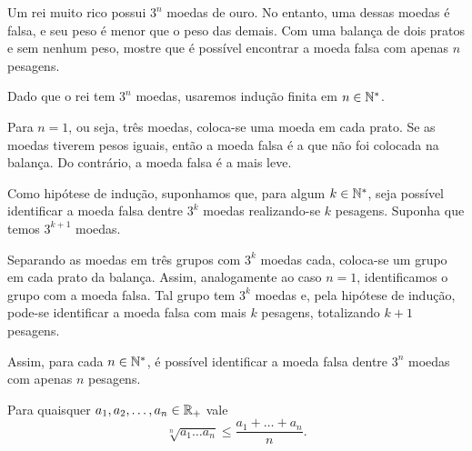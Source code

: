 \begin{example}
Um rei muito rico possui $3^n$ moedas de ouro. No entanto, uma dessas moedas é falsa, e seu peso é menor que o peso das demais. Com uma balança de dois pratos e sem nenhum peso, mostre que é possível encontrar a moeda falsa com apenas $n$ pesagens.
\end{example}

\begin{solution}
Dado que o rei tem $3^n$ moedas, usaremos indução finita em $n \in \mathbb{N}^*$. 

Para $n=1$, ou seja, três moedas, coloca-se uma moeda em cada prato. Se as moedas tiverem pesos iguais, então a moeda falsa é a que não foi colocada na balança. Do contrário, a moeda falsa é a mais leve.

Como hipótese de indução, suponhamos que, para algum $k \in \mathbb{N}^*$, seja possível identificar a moeda falsa dentre $3^k$ moedas realizando-se $k$ pesagens. Suponha que temos $3^{k+1}$ moedas. 

Separando as moedas em três grupos com $3^k$ moedas cada, coloca-se um grupo em cada prato da balança. Assim, analogamente ao caso $n = 1$, identificamos o grupo com a moeda falsa. Tal grupo tem $3^k$ moedas e, pela hipótese de indução, pode-se identificar a moeda falsa com mais $k$  pesagens, totalizando $k+1$ pesagens.

Assim, para cada $n \in \mathbb{N}^*$, é possível identificar a moeda falsa dentre $3^n$ moedas com apenas $n$ pesagens.
\end{solution}

\begin{theorem}
Para quaisquer $a_1, a_2, \dots , a_n \in \mathbb{R}_+$ vale
\begin{equation}
    \sqrt[n]{a_1\dots a_n} \leq \frac {a_1 + \dots + a_n} n.
\end{equation}
\end{theorem}